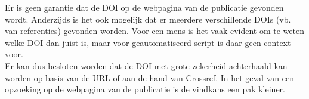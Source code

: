 Er is geen garantie dat de DOI op de webpagina van de publicatie gevonden wordt. Anderzijds is het ook mogelijk dat er meerdere verschillende DOIs (vb. van referenties) gevonden worden. Voor een mens is het vaak evident om te weten welke DOI dan juist is, maar voor geautomatiseerd script is daar geen context voor.\\
Er kan dus besloten worden dat de DOI met grote zekerheid achterhaald kan worden op basis van de URL of aan de hand van Crossref. In het geval van een opzoeking op de webpagina van de publicatie is de vindkans een pak kleiner.

